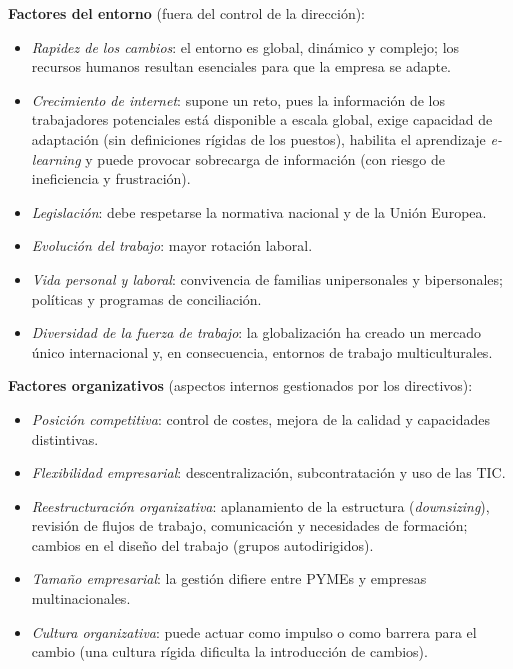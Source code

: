 \documentclass[12pt]{book} %
\providecommand{\tightlist}{%
  \setlength{\itemsep}{0pt}\setlength{\parskip}{0pt}}
\begin{document}
\textbf{Factores del entorno} (fuera del control de la dirección):

\begin{itemize}
\tightlist
\item
  \emph{Rapidez de los cambios}: el entorno es global, dinámico y
  complejo; los recursos humanos resultan esenciales para que la empresa
  se adapte.
\item
  \emph{Crecimiento de internet}: supone un reto, pues la información de
  los trabajadores potenciales está disponible a escala global, exige
  capacidad de adaptación (sin definiciones rígidas de los puestos),
  habilita el aprendizaje \emph{e-learning} y puede provocar sobrecarga
  de información (con riesgo de ineficiencia y frustración).
\item
  \emph{Legislación}: debe respetarse la normativa nacional y de la
  Unión Europea.
\item
  \emph{Evolución del trabajo}: mayor rotación laboral.
\item
  \emph{Vida personal y laboral}: convivencia de familias unipersonales
  y bipersonales; políticas y programas de conciliación.
\item
  \emph{Diversidad de la fuerza de trabajo}: la globalización ha creado
  un mercado único internacional y, en consecuencia, entornos de trabajo
  multiculturales.
\end{itemize}

\textbf{Factores organizativos} (aspectos internos gestionados por los
directivos):

\begin{itemize}
\tightlist
\item
  \emph{Posición competitiva}: control de costes, mejora de la calidad y
  capacidades distintivas.
\item
  \emph{Flexibilidad empresarial}: descentralización, subcontratación y
  uso de las TIC.
\item
  \emph{Reestructuración organizativa}: aplanamiento de la estructura
  (\emph{downsizing}), revisión de flujos de trabajo, comunicación y
  necesidades de formación; cambios en el diseño del trabajo (grupos
  autodirigidos).
\item
  \emph{Tamaño empresarial}: la gestión difiere entre PYMEs y empresas
  multinacionales.
\item
  \emph{Cultura organizativa}: puede actuar como impulso o como barrera
  para el cambio (una cultura rígida dificulta la introducción de
  cambios).
\end{itemize}
\end{document}
